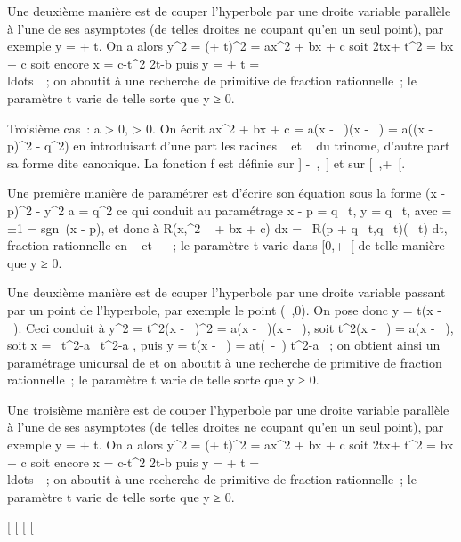 \documentclass[]{article}
\begin{document}
Une deuxième manière est de couper l'hyperbole \Gamma par une droite variable
parallèle à l'une de ses asymptotes (de telles droites ne coupant \Gamma
qu'en un seul point), par exemple y = \sqrtax + t. On
a alors y^2 = (\sqrtax + t)^2 =
ax^2 + bx + c soit 2tx\sqrta +
t^2 = bx + c soit encore x = c-t^2
\over 2t\sqrta-b puis y =
\sqrtax + t =
\\ldots~~; on
aboutit à une recherche de primitive de fraction rationnelle~; le
paramètre t varie de telle sorte que y ≥ 0.

Troisième cas~: a > 0, \Delta > 0. On écrit
ax^2 + bx + c = a(x - \alpha~)(x - \beta~) = a((x - p)^2 -
q^2) en introduisant d'une part les racines \alpha~ et \beta~ du
trinome, d'autre part sa forme dite canonique. La fonction f est définie
sur ] -\infty~,\alpha~] et sur [\beta~,+\infty~[.

Une première manière de paramétrer \Gamma est d'écrire son équation sous la
forme (x - p)^2 - y^2 \over a =
q^2 ce qui conduit au paramétrage x - p =
q\epsilon\mathrmch~ t, y =
q\sqrta\mathrmsh~
t, avec \epsilon = ±1 = sgn~(x - p), et donc à
\int  R(x,\sqrtax^2 ~
+ bx + c) dx =\int ~ R(p +
q\epsilon\mathrmch~
t,q\sqrta\mathrmsh~
t)(\epsilonq\mathrmsh~ t) dt,
fraction rationnelle en
\mathrmsh~ et
\mathrmch~ ~; le paramètre t
varie dans [0,+\infty~[ de telle manière que y ≥ 0.

Une deuxième manière est de couper l'hyperbole \Gamma par une droite variable
passant par un point de l'hyperbole, par exemple le point (\alpha~,0). On pose
donc y = t(x - \alpha~). Ceci conduit à y^2 = t^2(x -
\alpha~)^2 = a(x - \alpha~)(x - \beta~), soit t^2(x - \alpha~) = a(x - \beta~),
soit x = \alpha~t^2-a\beta~ \over t^2-a ,
puis y = t(x - \alpha~) = at(\beta~-\alpha~) \over t^2-a ~;
on obtient ainsi un paramétrage unicursal de \Gamma et on aboutit à une
recherche de primitive de fraction rationnelle~; le paramètre t varie de
telle sorte que y ≥ 0.

Une troisième manière est de couper l'hyperbole \Gamma par une droite
variable parallèle à l'une de ses asymptotes (de telles droites ne
coupant \Gamma qu'en un seul point), par exemple y =
\sqrtax + t. On a alors y^2 =
(\sqrtax + t)^2 = ax^2 + bx + c
soit 2tx\sqrta + t^2 = bx + c soit encore
x = c-t^2 \over
2t\sqrta-b puis y = \sqrtax + t
= \\ldots~~; on
aboutit à une recherche de primitive de fraction rationnelle~; le
paramètre t varie de telle sorte que y ≥ 0.

[
[
[
[
\end{document}
